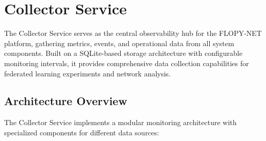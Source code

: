 \section{Collector Service}
\label{sec:collector-service}

The Collector Service serves as the central observability hub for the FLOPY-NET platform, gathering metrics, events, and operational data from all system components. Built on a SQLite-based storage architecture with configurable monitoring intervals, it provides comprehensive data collection capabilities for federated learning experiments and network analysis.

\subsection{Architecture Overview}

The Collector Service implements a modular monitoring architecture with specialized components for different data sources:

